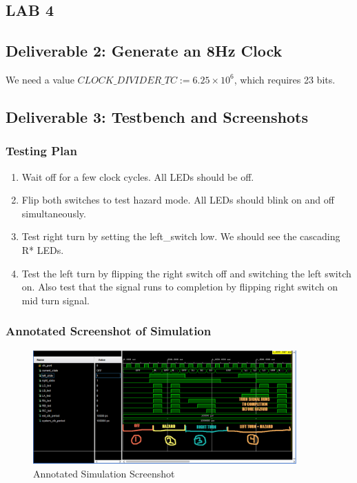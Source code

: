 \documentclass[10pt]{article}
\begin{document}

\begin{centering}
  \section*{LAB 4}
\end{centering}

\subsection*{Deliverable 2: Generate an 8Hz Clock}

We need a value $ CLOCK\_DIVIDER\_TC := 6.25 \times 10^6 $, which requires 23 bits.

\subsection*{Deliverable 3: Testbench and Screenshots}

\subsubsection*{Testing Plan}

\begin{enumerate}
  \item Wait off for a few clock cycles. All LEDs should be off.
  \item Flip both switches to test hazard mode. All LEDs should blink on and off simultaneously.
  \item Test right turn by setting the left\_switch low. We should see the cascading R* LEDs.
  \item Test the left turn by flipping the right switch off and switching the left switch on. Also test that the signal runs to completion by flipping right switch on mid turn signal. 
\end{enumerate}

\subsubsection*{Annotated Screenshot of Simulation}

\begin{figure} [H]
  \center
  \includegraphics[width=0.9\textwidth]{figures/simulation_annotated.png}
  \caption{Annotated Simulation Screenshot}
\end{figure}
\end{document}
